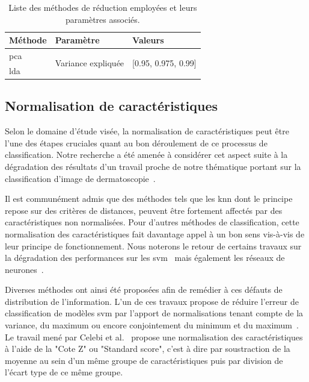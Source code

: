 \begin{table}[H]
    \centering
    \begin{tabular*}{0.6\linewidth}{lll}
        \toprule
        \textbf{Méthode}       & \textbf{Paramètre}                 & \textbf{Valeurs}                      \\ \midrule
        \gls{pca}              & \multirow{2}{*}{Variance expliquée}& \multirow{2}{*}{[0.95, 0.975, 0.99]}  \\ \cline{1-1}
        \gls{lda}              &                                    &                                       \\ 
        \bottomrule
    \end{tabular*}
    \caption{Liste des méthodes de réduction employées et leurs paramètres associés.}
    \label{tab:summary_reduction_methods}
\end{table}\par

\subsection{Normalisation de caractéristiques}
\label{subsec:features_normalisation}
Selon le domaine d'étude visée, la normalisation de caractéristiques peut être l'une des étapes cruciales quant au bon déroulement de ce processus de classification. Notre recherche a été amenée à considérer cet aspect suite à la dégradation des résultats d'un travail proche de notre thématique portant sur la classification d'image de dermatoscopie~\cite{Celebi2007}.\par

Il est communément admis que des méthodes tels que les \gls{knn} dont le principe repose sur des critères de distances, peuvent être fortement affectés par des caractéristiques non normalisées. Pour d'autres méthodes de classification, cette normalisation des caractéristiques fait davantage appel à un bon sens vis-à-vis de leur principe de fonctionnement. Nous noterons le retour de certains travaux sur la dégradation des performances sur les \gls{svm}~\cite{Juszczak2002} mais également les réseaux de neurones~\cite{Celebi2007}.\par

Diverses méthodes ont ainsi été proposées afin de remédier à ces défauts de distribution de l'information. L'un de ces travaux propose de réduire l'erreur de classification de modèles \gls{svm} par l'apport de normalisations tenant compte de la variance, du maximum ou encore conjointement du minimum et du maximum~\cite{Juszczak2002}. Le travail mené par Celebi et al.~\cite{Celebi2007} propose une normalisation des caractéristiques à l'aide de la "Cote Z" ou "Standard score", c'est à dire par soustraction de la moyenne au sein d'un même groupe de caractéristiques puis par division de l'écart type de ce même groupe.\par

